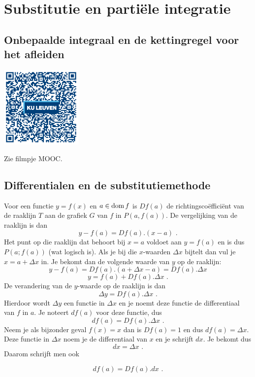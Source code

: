 \section{Substitutie en parti\"ele integratie}

\subsection{Onbepaalde integraal en de kettingregel voor het afleiden}
\begin{minipage}{.25\linewidth}
	\raggedright
	\includegraphics[width=4cm]{6_afgeleiden_integralen/inputs/QR_Code_OPPKETTINGINT_module6_3new}
\end{minipage}
\begin{minipage}{.7\linewidth}
	Zie filmpje MOOC.
\end{minipage}


\subsection{Differentialen en de substitutiemethode}

Voor een functie $y=f(x)$ en $a \in \operatorname{dom} f$ is $Df(a)$ de richtingsco\"effici\"ent van de raaklijn $T$ aan de grafiek $G$ van $f$ in $P(a,f(a))$.
De vergelijking van de raaklijn is dan
\[
y-f(a)=Df(a).(x-a) \text { .}
\]
Het punt op die raaklijn dat behoort bij $x=a$ voldoet aan $y=f(a)$ en is dus $P(a;f(a))$ (wat logisch is).
Als je bij die $x$-waarden $\Delta x$ bijtelt dan vul je $x=a+\Delta x$ in.
Je bekomt dan de volgende waarde van $y$ op de raaklijn:
\[
y-f(a)=Df(a).(a+\Delta x -a)=Df(a).\Delta x
\]
\[
y=f(a)+Df(a).\Delta x \text { .}
\]
De verandering van de $y$-waarde op de raaklijn is dan
\[
\Delta y=Df(a).\Delta x \text { .}
\]
Hierdoor wordt $\Delta y$ een functie in $\Delta x$ en je noemt deze functie de differentiaal van $f$ in $a$.
Je noteert  $df(a)$ voor deze functie, dus
\[
df(a)=Df(a).\Delta x \text { .}
\]
Neem je als bijzonder geval $f(x)=x$ dan is $Df(a)=1$ en dus $df(a)=\Delta x$.
Deze functie in $\Delta x$ noem je de differentiaal van $x$ en je schrijft $dx$.
Je bekomt dus
\[
dx=\Delta x \text { .}
\]
Daarom schrijft men ook
\begin{definitie}
	\[
df(a)=Df(a).dx \text { .}
\]
\end{definitie}


